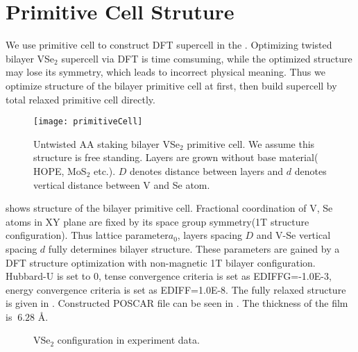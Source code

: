 \section{Primitive Cell Struture}

We use primitive cell to construct DFT supercell in the . Optimizing twisted bilayer VSe$_2$ supercell via DFT is time comsuming, while the optimized structure may lose its symmetry, which leads to incorrect physical meaning. Thus we optimize structure of the bilayer primitive cell at first, then build supercell by total relaxed primitive cell directly.

\begin{figure}[]
	\texttt{[image: primitiveCell]}
	\caption[Untwisted AA staking bilayer VSe$_2$ primitive cell.]{
		Untwisted AA staking bilayer VSe$_2$ primitive cell. We assume this structure is free standing. \ie Layers are grown without base material( \eg HOPE, MoS$_2$ etc.). $D$ denotes distance between layers and $d$ denotes vertical distance between V and Se atom.
	}
\end{figure}

 shows structure of the bilayer primitive cell. Fractional coordination of V, Se atoms in XY plane are fixed by its space group symmetry(1T structure configuration). Thus lattice parameter$a_0$, layers spacing $D$ and V-Se vertical spacing $d$ fully determines bilayer structure. These parameters are gained by a DFT structure optimization with non-magnetic 1T bilayer configuration. Hubbard-U is set to 0, tense convergence criteria is set as EDIFFG=-1.0E-3, energy convergence criteria is set as EDIFF=1.0E-8. The fully relaxed structure is given in . Constructed POSCAR file can be seen in . The thickness of the film is $~ 6.28$ Å. 

\begin{figure}[ht]
	\caption[VSe$_2$ configuration in experiment data]{
		VSe$_2$ configuration in experiment data.
	}
\end{figure}

